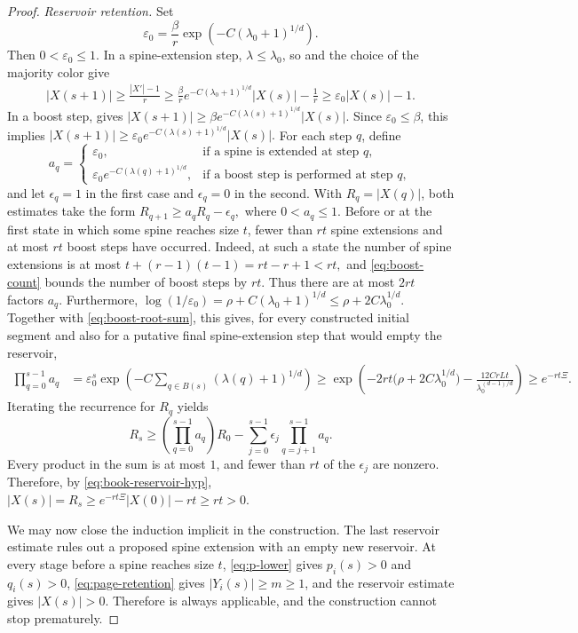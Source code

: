 \documentclass[10pt,a4paper]{amsart}
\begin{document}
\begin{proof}
\medskip
\noindent\emph{Reservoir retention.}
Set
\[
 \varepsilon_0=\frac\beta r
 \exp\!\left(-C(\lambda_0+1)^{1/d}\right).
\]
Then $0<\varepsilon_0\le1$. In a spine-extension step,
$\lambda\le\lambda_0$, so  and the choice of the majority
color give
\begin{align*}
 |X(s+1)|
 \ge\frac{|X'|-1}{r}\ge\frac\beta r
       e^{-C(\lambda_0+1)^{1/d}}|X(s)|-\frac1r\ge\varepsilon_0|X(s)|-1.
\end{align*}
In a boost step,  gives
$
 |X(s+1)|
 \ge\beta e^{-C(\lambda(s)+1)^{1/d}}|X(s)|.
$
Since $\varepsilon_0\le\beta$, this implies
$
 |X(s+1)|
\ge\varepsilon_0e^{-C(\lambda(s)+1)^{1/d}}|X(s)|.
$
For each step $q$, define
\[
 a_q=
 \begin{cases}
  \varepsilon_0,&\text{if a spine is extended at step $q$},\\
  \varepsilon_0e^{-C(\lambda(q)+1)^{1/d}},
  &\text{if a boost step is performed at step $q$},
 \end{cases}
\]
and let $\epsilon_q=1$ in the first case and $\epsilon_q=0$ in the second.
With $R_q=|X(q)|$, both estimates take the form
$
 R_{q+1}\ge a_qR_q-\epsilon_q,$ where $
 0<a_q\le1.
$
Before or at the first state in which some spine reaches size $t$, fewer than
$rt$ spine extensions and at most $rt$ boost steps have occurred. Indeed, at
such a state the number of spine extensions is at most
$
 t+(r-1)(t-1)=rt-r+1<rt,
$
and \eqref{eq:boost-count} bounds the number of boost steps by $rt$. Thus
there are at most $2rt$ factors $a_q$. Furthermore,
$\log(1/\varepsilon_0)
=\rho+C(\lambda_0+1)^{1/d}
\le\rho+2C\lambda_0^{1/d}.
$
Together with \eqref{eq:boost-root-sum}, this gives, for every constructed
initial segment and also for a putative final spine-extension step that would
empty the reservoir,
\begin{align*}
 \prod_{q=0}^{s-1}a_q
 &=\varepsilon_0^s
 \exp\!\left(-C\sum_{q\in B(s)}(\lambda(q)+1)^{1/d}\right)\ge\exp\!\left(
-2rt\bigl(\rho+2C\lambda_0^{1/d}\bigr)
 -\frac{12CrLt}{\lambda_0^{(d-1)/d}}
 \right)\ge e^{-rt\Xi}.
\end{align*}
Iterating the recurrence for $R_q$ yields
\[
 R_s\ge
 \left(\prod_{q=0}^{s-1}a_q\right)R_0
 -\sum_{j=0}^{s-1}\epsilon_j
  \prod_{q=j+1}^{s-1}a_q.
\]
Every product in the sum is at most $1$, and fewer than $rt$ of the
$\epsilon_j$ are nonzero. Therefore, by
\eqref{eq:book-reservoir-hyp},
$
 |X(s)|=R_s
 \ge e^{-rt\Xi}|X(0)|-rt
 \ge rt>0.
$

We may now close the induction implicit in the construction. The last
reservoir estimate rules out a proposed spine extension with an empty new
reservoir. At every stage before a spine reaches size $t$,
\eqref{eq:p-lower} gives $p_i(s)>0$ and $q_i(s)>0$,
\eqref{eq:page-retention} gives $|Y_i(s)|\ge m\ge1$, and the reservoir
estimate gives $|X(s)|>0$. Therefore  is always applicable,
and the construction cannot stop prematurely.


\end{proof}
\end{document}
